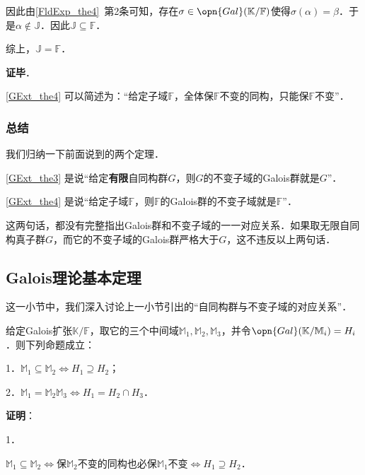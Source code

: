 因此由\autoref{FldExp_the4}~第2条可知，存在$\sigma\in\opn{Gal}(\mathbb{K}/\mathbb{F})$使得$\sigma(\alpha)=\beta$．于是$\alpha\not\in \mathbb{J}$．因此$\mathbb{J}\subseteq\mathbb{F}$．

综上，$\mathbb{J}=\mathbb{F}$．

\textbf{证毕}．


\autoref{GExt_the4} 可以简述为：“给定子域$\mathbb{F}$，全体保$\mathbb{F}$不变的同构，只能保$\mathbb{F}$不变”．




\subsubsection{总结}

我们归纳一下前面说到的两个定理．

\autoref{GExt_the3} 是说“给定\textbf{有限}自同构群$G$，则$G$的不变子域的Galois群就是$G$”．

\autoref{GExt_the4} 是说“给定子域$\mathbb{F}$，则$\mathbb{F}$的Galois群的不变子域就是$\mathbb{F}$”．


这两句话，都没有完整指出Galois群和不变子域的一一对应关系．如果取无限自同构真子群$G$，而它的不变子域的Galois群严格大于$G$，这不违反以上两句话．








\subsection{Galois理论基本定理}\label{GExt_sub1}

这一小节中，我们深入讨论上一小节引出的“自同构群与不变子域的对应关系”．


\begin{lemma}{}\label{GExt_lem1}
给定Galois扩张$\mathbb{K}/\mathbb{F}$，取它的三个中间域$\mathbb{M}_1, \mathbb{M}_2, \mathbb{M}_3$，并令$\opn{Gal}(\mathbb{K}/\mathbb{M}_i)=H_i$．则下列命题成立：

1．$\mathbb{M}_1\subseteq \mathbb{M}_2 \iff H_1\supseteq H_2$；

2．$\mathbb{M}_1=\mathbb{M}_2\mathbb{M}_3 \iff H_1=H_2\cap H_3$．
\end{lemma}

\textbf{证明}：

1．

$\mathbb{M}_1\subseteq\mathbb{M}_2 \iff$保$\mathbb{M}_2$不变的同构也必保$\mathbb{M}_1$不变$\iff H_1\supseteq H_2$．

